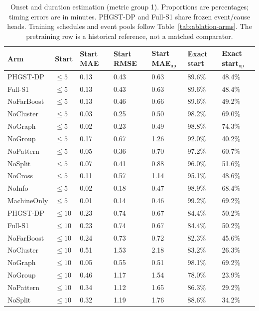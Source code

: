 \begin{table}[p]
\centering
\scriptsize
\setlength{\tabcolsep}{3pt}
\renewcommand{\arraystretch}{1.12}
\caption{Onset and duration estimation (metric group 1). Proportions are percentages; timing errors are in minutes. PHGST-DP and Full-S1 share frozen event/cause heads. Training schedules and event pools follow Table~\ref{tab:ablation-arms}. The pretraining row is a historical reference, not a matched comparator.}
\label{tab:complete-2-1}
\begin{tabularx}{\textwidth}{@{}lXXXXXX@{}}
\toprule
Arm & Start & Start MAE & Start RMSE & Start MAE$_{\mathrm{up}}$ & Exact start & Exact start$_{\mathrm{up}}$ \\
\midrule
PHGST-DP & $\le 5$ & 0.13 & 0.43 & 0.63 & 89.6\% & 48.4\% \\
Full-S1 & $\le 5$ & 0.13 & 0.43 & 0.63 & 89.6\% & 48.4\% \\
NoFarBoost & $\le 5$ & 0.13 & 0.46 & 0.66 & 89.6\% & 49.2\% \\
NoCluster & $\le 5$ & 0.03 & 0.25 & 0.50 & 98.2\% & 69.0\% \\
NoGraph & $\le 5$ & 0.02 & 0.23 & 0.49 & 98.8\% & 74.3\% \\
NoGroup & $\le 5$ & 0.17 & 0.67 & 1.26 & 92.0\% & 40.2\% \\
NoPattern & $\le 5$ & 0.05 & 0.36 & 0.70 & 97.2\% & 60.7\% \\
NoSplit & $\le 5$ & 0.07 & 0.41 & 0.88 & 96.0\% & 51.6\% \\
NoCross & $\le 5$ & 0.11 & 0.57 & 1.14 & 95.1\% & 48.6\% \\
NoInfo & $\le 5$ & 0.02 & 0.18 & 0.47 & 98.9\% & 68.4\% \\
MachineOnly & $\le 5$ & 0.01 & 0.14 & 0.46 & 99.2\% & 69.2\% \\
\midrule
PHGST-DP & $\le 10$ & 0.23 & 0.74 & 0.67 & 84.4\% & 50.2\% \\
Full-S1 & $\le 10$ & 0.23 & 0.74 & 0.67 & 84.4\% & 50.2\% \\
NoFarBoost & $\le 10$ & 0.24 & 0.73 & 0.72 & 82.3\% & 45.6\% \\
NoCluster & $\le 10$ & 0.51 & 1.53 & 2.18 & 83.2\% & 26.3\% \\
NoGraph & $\le 10$ & 0.05 & 0.55 & 0.51 & 98.1\% & 69.2\% \\
NoGroup & $\le 10$ & 0.46 & 1.17 & 1.54 & 78.0\% & 23.9\% \\
NoPattern & $\le 10$ & 0.34 & 1.12 & 1.65 & 86.3\% & 29.2\% \\
NoSplit & $\le 10$ & 0.32 & 1.19 & 1.76 & 88.6\% & 34.2\% \\

\end{tabularx}
\end{table}
